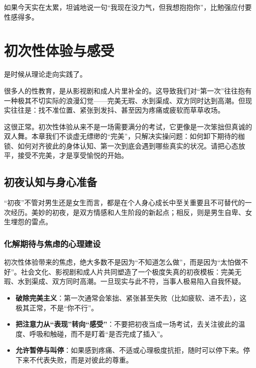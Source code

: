 \documentclass[12pt,UTF8]{ctexbook}
\begin{document}
\begin{tcolorbox}[colback=pink!5!white,colframe=red!50!black,title=贴心小叮咛]
如果今天实在太累，坦诚地说一句“我现在没力气，但我想抱抱你”，比勉强应付要性感得多。
\end{tcolorbox}

\chapter{初次性体验与感受}

是时候从理论走向实践了。

很多人的性教育，是从影视剧和成人片里补全的。这导致我们对“第一次”往往抱有一种极其不切实际的浪漫幻觉——完美无瑕、水到渠成、双方同时达到高潮。但现实往往是：找不准位置、紧张到发抖、甚至因为疼痛或疲软而草草收场。

这很正常。初次性体验从来不是一场需要满分的考试，它更像是一次笨拙但真诚的双人舞。本章我们不谈虚无缥缈的“完美”，只解决实操问题：如何卸下期待的枷锁、如何对齐彼此的身体认知、第一次到底会遇到哪些真实的状况。请把心态放平，接受不完美，才是享受愉悦的开始。

\section{初夜认知与身心准备}

“初夜”不管对男生还是女生而言，都是在个人身心成长中至关重要且不可替代的一次经历。美妙的初夜，是双方情感和人生阶段的新起点；相反，则是男生自卑、女生埋怨的雷点。

\subsection{化解期待与焦虑的心理建设}

初次性体验带来的焦虑，绝大多数不是因为“不知道怎么做”，而是因为“太怕做不好”。社会文化、影视剧和成人片共同塑造了一个极度失真的初夜模板：完美无瑕、水到渠成、双方同时高潮。一旦现实与此不符，当事人极易陷入自我怀疑。

\begin{itemize}
\item \textbf{破除完美主义}：第一次通常会笨拙、紧张甚至失败（比如疲软、进不去），这极其正常，不是“你不行”。
\item \textbf{把注意力从“表现”转向“感受”}：不要把初夜当成一场考试，去关注彼此的温度、呼吸和触碰，而不是盯着“是否完成了插入”。
\item \textbf{允许暂停与叫停}：如果感到疼痛、不适或心理极度抗拒，随时可以停下来。停下来不代表失败，而是对彼此的尊重。
\end{itemize}
\end{document}

